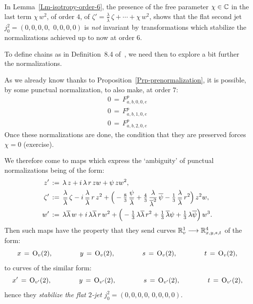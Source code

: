 \documentclass[12pt,twoside,leqno,openany]{amsart}
\makeatletter
\newcommand{\reqnomode}{\tagsleft@false}\makeatother
\makeatother
\begin{document}
In Lemma~{\ref{Lm-isotropy-order-6}}, the presence of the 
free parameter
$\chi \in \mathbb{C}$ in the last term $\chi\, w^2$, of order $4$, of
$\zeta' = \frac{\lambda}{\overline{\lambda}}\,
\zeta + \cdots + \chi\, w^2$, shows that
the flat second jet $j_0^2 = (0, 0, 0, 0,\,\, 0, 0, 0, 0)$
is {\em not} invariant by transformations which 
stabilize the normalizations achieved up to now at order $6$.

To define chains as in
Definition~8.4 of~{\cite{Merker-2020}}, 
we need then to explore a bit further the normalizations.

As we already know thanks to 
Proposition~{\ref{Prp-prenormalization}}, it is possible,
by some punctual normalization, to also make, at order $7$:
\reqnomode{}
\begin{align}
0
\,=\,
F_{a,b,0,0,e}^p
\tag{(a+b+2e=7),}
\\
0
\,=\,
F_{a,b,1,0,e}^p
\tag{(a+b+2e=6),}
\\
0
\,=\,
F_{a,b,2,0,e}^p
\tag{(a+b+2e=5).}
\end{align}
Once these normalizations are done, the condition that they
are preserved forces $\chi = 0$ (exercise).

We therefore come to maps which express the `ambiguity' of punctual
normalizations being of the form:
\[
\aligned
z'
&
\,:=\,
\lambda\,z
+
i\,\lambda\,r\,
zw
+
\psi\,
zw^2,
\\
\zeta'
&
\,:=\,
\frac{\lambda}{\overline{\lambda}}\,
\zeta
-
i\,
\frac{\lambda}{\overline{\lambda}}\,r\,
z^2
+
\Big(
-\tfrac{8}{3}\,\frac{\psi}{\overline{\lambda}}
+
\tfrac{4}{3}\,\frac{\lambda}{\overline{\lambda}^2}\,
\overline{\psi}
-
\tfrac{1}{3}\,\frac{\lambda}{\overline{\lambda}}\,r^2
\Big)\,
z^2w,
\\
w'
&
\,:=\,
\lambda\overline{\lambda}\,w
+
i\,\lambda\overline{\lambda}\,r\,
w^2
+
\Big(
-\tfrac{1}{3}\,\lambda\overline{\lambda}\,r^2
+
\tfrac{1}{3}\,\overline{\lambda}\psi
+
\tfrac{1}{3}\,\lambda\overline{\psi}
\Big)\,
w^3.
\endaligned
\]
Then such maps have the property that 
they send curves
$\mathbb{R}_v^1 \longrightarrow \mathbb{R}_{x,y,s,t}^4$ of the form:
\[
x
\,=\,
{\rm O}_v(2),
\ \ \ \ \ \ \ \ \ \ \ \
y
\,=\,
{\rm O}_v(2),
\ \ \ \ \ \ \ \ \ \ \ \
s
\,=\,
{\rm O}_v(2),
\ \ \ \ \ \ \ \ \ \ \ \
t
\,=\,
{\rm O}_v(2),
\]
to curves of the similar form:
\[
x'
\,=\,
{\rm O}_{v'}(2),
\ \ \ \ \ \ \ \ \ \ \ \
y
\,=\,
{\rm O}_{v'}(2),
\ \ \ \ \ \ \ \ \ \ \ \
s
\,=\,
{\rm O}_{v'}(2),
\ \ \ \ \ \ \ \ \ \ \ \
t
\,=\,
{\rm O}_{v'}(2),
\]
hence they {\em stabilize the flat $2$-jet $j_0^2 = 
(0, 0, 0, 0,\, 0, 0, 0, 0)$}.
\end{document}
